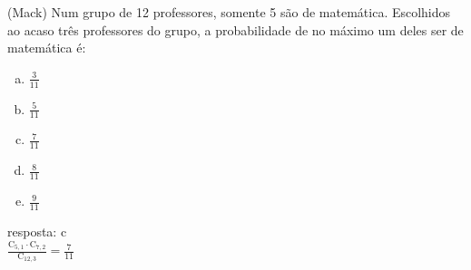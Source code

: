 \begin{ex}
 (Mack) Num grupo de 12 professores, somente 5 são de matemática. Escolhidos ao acaso três professores do grupo, a probabilidade de no máximo um deles ser de matemática é:
    \begin{enumerate}[(a)]
    \item $\frac{3}{11}$
    \item $\frac{5}{11}$
    \item $\frac{7}{11}$
    \item $\frac{8}{11}$
    \item $\frac{9}{11}$
    \end{enumerate}
      \begin{sol}
       resposta: c \\
       $\frac{\mathrm{C}_{5,1}\cdot\mathrm{C}_{7,2}}{\mathrm{C}_{{12},3}}=\frac{7}{11}$
      \end{sol}
\end{ex}